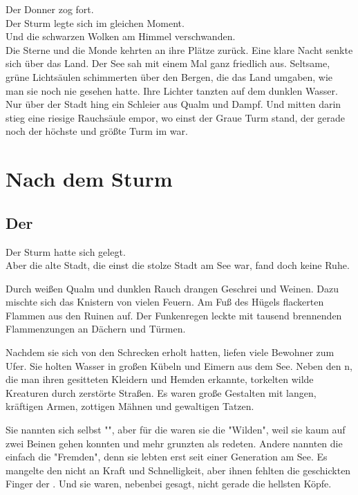 \begin{huge}
\begin{itshape}
Der Donner zog fort.\\
Der Sturm legte sich im gleichen Moment.\\
Und die schwarzen Wolken am Himmel verschwanden.\\
Die Sterne und die Monde kehrten an ihre Plätze zurück. 
Eine klare Nacht senkte sich über das Land. Der See sah mit einem Mal ganz friedlich aus. Seltsame, grüne Lichtsäulen schimmerten über den Bergen, die das Land umgaben, wie man sie noch nie gesehen hatte. Ihre Lichter tanzten auf dem dunklen Wasser. Nur über der Stadt hing ein Schleier aus Qualm und Dampf. Und mitten darin stieg eine riesige Rauchsäule empor, wo einst der Graue Turm stand, der gerade noch der höchste und größte Turm im {\Enland} war.
\end{itshape}

\part{Nach dem Sturm}
\chapter{Der \Schattenlaufer}
Der Sturm hatte sich gelegt.\\
Aber die alte Stadt, die einst die stolze Stadt {\Tern} am See war, fand doch keine Ruhe.
 
Durch weißen Qualm und dunklen Rauch drangen Geschrei und Weinen. Dazu mischte sich das Knistern von vielen Feuern. Am Fuß des Hügels flackerten Flammen aus den Ruinen auf. Der Funkenregen leckte mit tausend brennenden Flammenzungen an Dächern und Türmen. 

Nachdem sie sich von den Schrecken erholt hatten, liefen viele Bewohner zum Ufer. Sie holten Wasser in großen Kübeln und Eimern aus dem See. Neben den {\Enlaender}{n}, die man ihren gesitteten Kleidern und Hemden erkannte, torkelten wilde Kreaturen durch zerstörte Straßen. Es waren große Gestalten mit langen, kräftigen Armen, zottigen Mähnen und gewaltigen Tatzen.

Sie nannten sich selbst "{\Bangiri}", aber für die {\Enlaender} waren sie die "Wilden", weil sie kaum auf zwei Beinen gehen konnten und mehr grunzten als redeten. Andere nannten die {\Bangiri} einfach die "Fremden", denn sie lebten erst seit einer Generation am See. Es mangelte den {\Bangiri} nicht an Kraft und Schnelligkeit, aber ihnen fehlten die geschickten Finger der . Und sie waren, nebenbei gesagt, nicht gerade die hellsten Köpfe. 


\end{huge}
